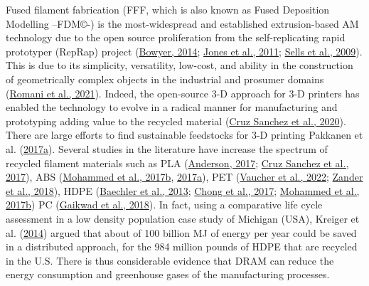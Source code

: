 \documentclass[
  12pt,
]{article}
\begin{document}
Fused filament fabrication (FFF, which is also known as Fused Deposition
Modelling --FDM©-) is the most-widespread and established
extrusion-based AM technology due to the open source proliferation from
the self-replicating rapid prototyper (RepRap) project
(\protect\hyperlink{ref-bowyer2014}{Bowyer, 2014};
\protect\hyperlink{ref-jones2011}{Jones et al., 2011};
\protect\hyperlink{ref-sells2009}{Sells et al., 2009}). This is due to
its simplicity, versatility, low-cost, and ability in the construction
of geometrically complex objects in the industrial and prosumer domains
(\protect\hyperlink{ref-romani2021}{Romani et al., 2021}). Indeed, the
open-source 3-D approach for 3-D printers has enabled the technology to
evolve in a radical manner for manufacturing and prototyping adding
value to the recycled material
(\protect\hyperlink{ref-cruzsanchez2020}{Cruz Sanchez et al., 2020}).
There are large efforts to find sustainable feedstocks for 3-D printing
Pakkanen et al. (\protect\hyperlink{ref-Pakkanen2017}{2017a}). Several
studies in the literature have increase the spectrum of recycled
filament materials such as PLA
(\protect\hyperlink{ref-anderson2017}{Anderson, 2017};
\protect\hyperlink{ref-cruzsanchez2017}{Cruz Sanchez et al., 2017}), ABS
(\protect\hyperlink{ref-mohammed2017a}{Mohammed et al., 2017b},
\protect\hyperlink{ref-mohammed2017}{2017a}), PET
(\protect\hyperlink{ref-vaucher2022}{Vaucher et al., 2022};
\protect\hyperlink{ref-zander2018}{Zander et al., 2018}), HDPE
(\protect\hyperlink{ref-baechler2013}{Baechler et al., 2013};
\protect\hyperlink{ref-chong2017}{Chong et al., 2017};
\protect\hyperlink{ref-mohammed2017a}{Mohammed et al., 2017b}) PC
(\protect\hyperlink{ref-gaikwad2018}{Gaikwad et al., 2018}). In fact,
using a comparative life cycle assessment in a low density population
case study of Michigan (USA), Kreiger et al.
(\protect\hyperlink{ref-kreiger2014}{2014}) argued that about of 100
billion MJ of energy per year could be saved in a distributed approach,
for the 984 million pounds of HDPE that are recycled in the U.S. There
is thus considerable evidence that DRAM can reduce the energy
consumption and greenhouse gases of the manufacturing processes.
\end{document}
